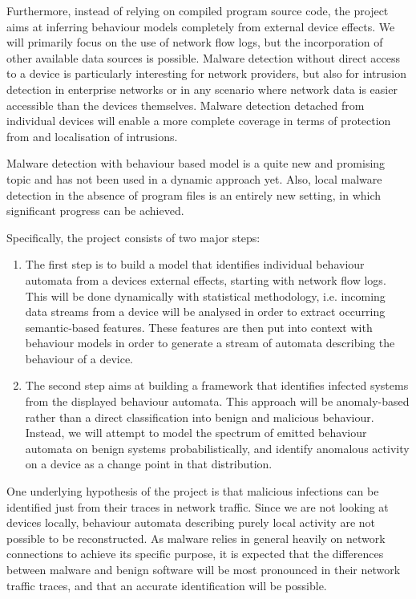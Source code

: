 \documentclass[a4paper,12pt,twoside]{report}
\begin{document}
Furthermore, instead of relying on compiled program source code, the project aims at inferring behaviour models completely from external device effects. We will primarily focus on the use of network flow logs, but the incorporation of other available data sources is possible. Malware detection without direct access to a device is particularly interesting for network providers, but also for intrusion detection in enterprise networks or in any scenario where network data is easier accessible than the devices themselves. Malware detection detached from individual devices will enable a more complete coverage in terms of protection from and localisation of intrusions.

Malware detection with behaviour based model is a quite new and promising topic and has not been used in a dynamic approach yet. Also, local malware detection in the absence of program files is an entirely new setting, in which significant progress can be achieved. 

\vspace{0.4cm}

Specifically, the project consists of two major steps:

\begin{enumerate}

\item  The first step is to build a model that identifies individual behaviour automata from a devices external effects, starting with network flow logs. This will be done dynamically with statistical methodology, i.e. incoming data streams from a device will be analysed in order to extract occurring semantic-based features. These features are then put into context with behaviour models in order to generate a stream of automata describing the behaviour of a device.

\item The second step aims at building a framework that identifies infected systems from the displayed behaviour automata. This approach will be anomaly-based rather than a direct classification into benign and malicious behaviour. Instead, we will attempt to model the spectrum of emitted behaviour automata on benign systems probabilistically, and identify anomalous activity on a device as a change point in that distribution.

\end{enumerate}

One underlying hypothesis of the project is that malicious infections can be identified just from their traces in network traffic. Since we are not looking at devices locally, behaviour automata describing purely local activity are not possible to be reconstructed. As malware relies in general heavily on network connections to achieve its specific purpose, it is expected that the differences between malware and benign software will be most pronounced in their network traffic traces, and that an accurate identification will be possible.
\end{document}
